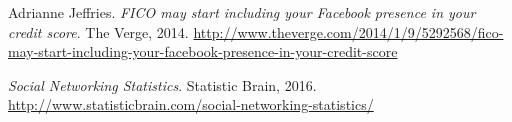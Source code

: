\documentclass[polish]{kbk}
\begin{document}
\begin{thebibliography}{9}
  Adrianne Jeffries.
  \emph{FICO may start including your Facebook presence in your credit score}.
  The Verge, 2014.
  \url{http://www.theverge.com/2014/1/9/5292568/fico-may-start-including-your-facebook-presence-in-your-credit-score}
  
  \emph{Social Networking Statistics}.
  Statistic Brain, 2016.
  \url{http://www.statisticbrain.com/social-networking-statistics/}
    
\end{thebibliography}
\end{document}
